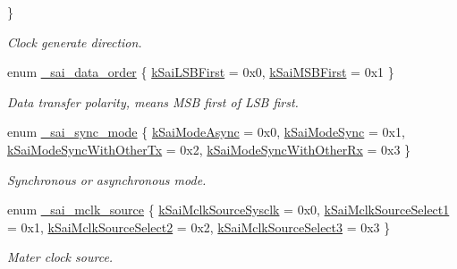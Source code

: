 \begin{DoxyCompactItemize}
 \}\begin{DoxyCompactList}\small\item\em Clock generate direction. \end{DoxyCompactList}
\item 
enum \hyperlink{group__sai__hal_ga835cf95188e9d76d02b573d525e6447a}{\+\_\+sai\+\_\+data\+\_\+order} \{ \hyperlink{group__sai__hal_gga835cf95188e9d76d02b573d525e6447aa13655d5f485836898719999a03247f95}{k\+Sai\+L\+S\+B\+First} = 0x0, 
\hyperlink{group__sai__hal_gga835cf95188e9d76d02b573d525e6447aa6258d4e3df576e89c0f87cc46cd66eb3}{k\+Sai\+M\+S\+B\+First} = 0x1
 \}\begin{DoxyCompactList}\small\item\em Data transfer polarity, means M\+SB first of L\+SB first. \end{DoxyCompactList}
\item 
enum \hyperlink{group__sai__hal_ga40bad4fe84f0826fe0565c46f0763395}{\+\_\+sai\+\_\+sync\+\_\+mode} \{ \hyperlink{group__sai__hal_gga40bad4fe84f0826fe0565c46f0763395a057177a032f80bff6b4d96ad1d11e833}{k\+Sai\+Mode\+Async} = 0x0, 
\hyperlink{group__sai__hal_gga40bad4fe84f0826fe0565c46f0763395a4a59702f545b74b9b97e29d495d433ef}{k\+Sai\+Mode\+Sync} = 0x1, 
\hyperlink{group__sai__hal_gga40bad4fe84f0826fe0565c46f0763395ab2a1b1698b20b4e447304111ba2e6782}{k\+Sai\+Mode\+Sync\+With\+Other\+Tx} = 0x2, 
\hyperlink{group__sai__hal_gga40bad4fe84f0826fe0565c46f0763395a666e77bb74cf01be0619f8b53164ddbc}{k\+Sai\+Mode\+Sync\+With\+Other\+Rx} = 0x3
 \}\begin{DoxyCompactList}\small\item\em Synchronous or asynchronous mode. \end{DoxyCompactList}
\item 
enum \hyperlink{group__sai__hal_gaaecbbb83a43bd9cfb1e3e96a049350a7}{\+\_\+sai\+\_\+mclk\+\_\+source} \{ \hyperlink{group__sai__hal_ggaaecbbb83a43bd9cfb1e3e96a049350a7ac6cbcec37c18aaa05405733a8848c566}{k\+Sai\+Mclk\+Source\+Sysclk} = 0x0, 
\hyperlink{group__sai__hal_ggaaecbbb83a43bd9cfb1e3e96a049350a7a38e640b8779066856f44b0a59461be37}{k\+Sai\+Mclk\+Source\+Select1} = 0x1, 
\hyperlink{group__sai__hal_ggaaecbbb83a43bd9cfb1e3e96a049350a7a7d54ff89acce0ca1c73a0620b286266a}{k\+Sai\+Mclk\+Source\+Select2} = 0x2, 
\hyperlink{group__sai__hal_ggaaecbbb83a43bd9cfb1e3e96a049350a7a5c57ffd864e9d9a29dca2f2efeb1bc47}{k\+Sai\+Mclk\+Source\+Select3} = 0x3
 \}\begin{DoxyCompactList}\small\item\em Mater clock source. \end{DoxyCompactList}

\end{DoxyCompactItemize}
